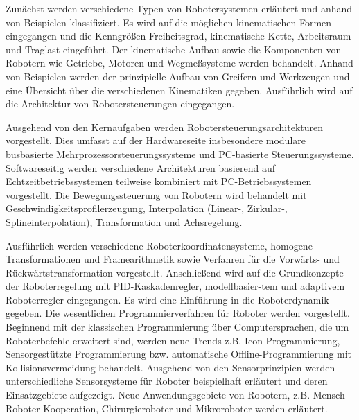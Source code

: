 \begin{module}
\begin{content}
Zunächst werden verschiedene Typen von Robotersystemen erläutert und anhand von Beispielen klassifiziert. Es wird auf die möglichen kinematischen Formen eingegangen und die Kenngrößen Freiheitsgrad, kinematische Kette, Arbeitsraum und Traglast eingeführt. Der kinematische Aufbau sowie die Komponenten von Robotern wie Getriebe, Motoren und Wegmeßsysteme werden behandelt. Anhand von Beispielen werden der prinzipielle Aufbau von Greifern und Werkzeugen und eine Übersicht über die verschiedenen Kinematiken gegeben. Ausführlich wird auf die Architektur von Robotersteuerungen eingegangen.

 

Ausgehend von den Kernaufgaben werden Robotersteuerungsarchitekturen vorgestellt. Dies umfasst auf der Hardwareseite insbesondere modulare busbasierte Mehrprozessorsteuerungssysteme und PC-basierte Steuerungssysteme. Softwareseitig werden verschiedene Architekturen basierend auf Echtzeitbetriebssystemen teilweise kombiniert mit PC-Betriebssystemen vorgestellt. Die Bewegungssteuerung von Robotern wird behandelt mit Geschwindigkeitsprofilerzeugung, Interpolation (Linear-, Zirkular-, Splineinterpolation), Transformation und Achsregelung.

 

Ausführlich werden verschiedene Roboterkoordinatensysteme, homogene Transformationen und Framearithmetik sowie Verfahren für die Vorwärts- und Rückwärtstransformation vorgestellt. Anschließend wird auf die Grundkonzepte der Roboterregelung mit PID-Kaskadenregler, modellbasier-tem und adaptivem Roboterregler eingegangen. Es wird eine Einführung in die Roboterdynamik gegeben. Die wesentlichen Programmierverfahren für Roboter werden vorgestellt. Beginnend mit der klassischen Programmierung über Computersprachen, die um Roboterbefehle erweitert sind, werden neue Trends z.B. Icon-Programmierung, Sensorgestützte Programmierung bzw. automatische Offline-Programmierung mit Kollisionsvermeidung behandelt. Ausgehend von den Sensorprinzipien werden unterschiedliche Sensorsysteme für Roboter beispielhaft erläutert und deren Einsatzgebiete aufgezeigt. Neue Anwendungsgebiete von Robotern, z.B. Mensch-Roboter-Kooperation, Chirurgieroboter und Mikroroboter werden erläutert.


\end{content}



\end{module}

